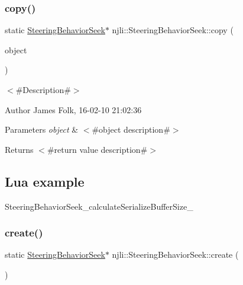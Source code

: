 \subsubsection{\texorpdfstring{copy()}{copy()}}
{\footnotesize\ttfamily static \mbox{\hyperlink{classnjli_1_1_steering_behavior_seek}{Steering\+Behavior\+Seek}}$\ast$ njli\+::\+Steering\+Behavior\+Seek\+::copy (\begin{DoxyParamCaption}\item[{const \mbox{\hyperlink{classnjli_1_1_steering_behavior_seek}{Steering\+Behavior\+Seek}} \&}]{object }\end{DoxyParamCaption})\hspace{0.3cm}{\ttfamily [static]}}



$<$\#\+Description\#$>$ 

\begin{DoxyAuthor}{Author}
James Folk, 16-\/02-\/10 21\+:02\+:36
\end{DoxyAuthor}

\begin{DoxyParams}{Parameters}
{\em object} & $<$\#object description\#$>$\\
\hline
\end{DoxyParams}
\begin{DoxyReturn}{Returns}
$<$\#return value description\#$>$
\end{DoxyReturn}
\hypertarget{classnjli_1_1_steering_behavior_wander_ex1}{}\subsection{Lua example}\label{classnjli_1_1_steering_behavior_wander_ex1}

\begin{DoxyCodeInclude}
\end{DoxyCodeInclude}
Steering\+Behavior\+Seek\+\_\+calculate\+Serialize\+Buffer\+Size\+\_\+ \mbox{\label{classnjli_1_1_steering_behavior_seek_a7e7c207db9cc51c0f8b659fa6fe970fd}} 
\subsubsection{\texorpdfstring{create()}{create()}\hspace{0.1cm}{\footnotesize\ttfamily [1/2]}}
{\footnotesize\ttfamily static \mbox{\hyperlink{classnjli_1_1_steering_behavior_seek}{Steering\+Behavior\+Seek}}$\ast$ njli\+::\+Steering\+Behavior\+Seek\+::create (\begin{DoxyParamCaption}{ }\end{DoxyParamCaption})\hspace{0.3cm}{\ttfamily [static]}}



